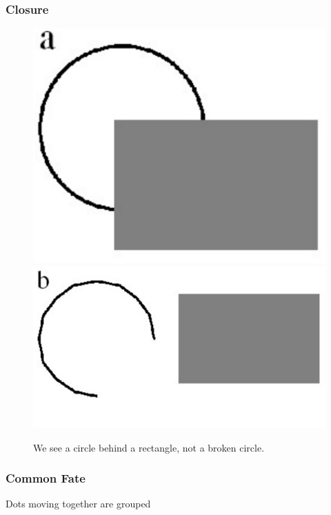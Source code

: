 \subsubsection{Closure}
\begin{center}
\begin{figure}[H]
    \centering
    
    \includegraphics[scale=0.25]{lectures/wk6/img/a.png}
    \includegraphics[scale=0.2]{lectures/wk6/img/b.png}
    
    \caption{We see a circle behind a rectangle, not a broken circle.}
\end{figure}
\end{center}

\subsubsection{Common Fate}
Dots moving together are grouped

